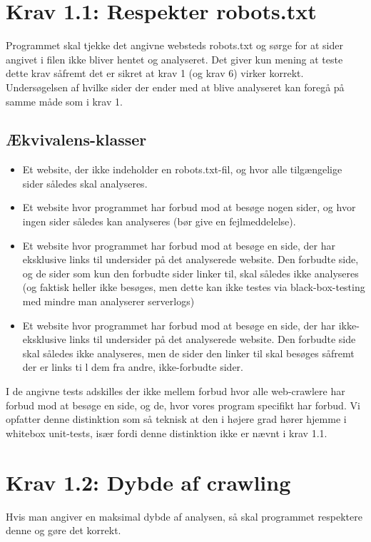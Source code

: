 \documentclass[a4paper,oneside,article, titlepage]{memoir}
\begin{document}
\section*{Krav 1.1: Respekter robots.txt}

Programmet skal tjekke det angivne websteds robots.txt og sørge for at
sider angivet i filen ikke bliver hentet og analyseret. Det giver kun
mening at teste dette krav såfremt det er sikret at krav 1 (og krav 6)
virker korrekt. Undersøgelsen af hvilke sider der ender med at blive
analyseret kan foregå på samme måde som i krav 1.

\subsection{Ækvivalens-klasser}
\begin{itemize}
\item Et website, der ikke indeholder en robots.txt-fil, og hvor alle
  tilgængelige sider således skal analyseres.
\item Et website hvor programmet har forbud mod at besøge nogen sider,
  og hvor ingen sider således kan analyseres (bør give en
  fejlmeddelelse).
\item Et website hvor programmet har forbud mod at besøge en side, der
  har eksklusive links til undersider på det analyserede website. Den
  forbudte side, og de sider som kun den forbudte sider linker til,
  skal således ikke analyseres (og faktisk heller ikke besøges, men
  dette kan ikke testes via black-box-testing med mindre man
  analyserer serverlogs)
\item Et website hvor programmet har forbud mod at besøge en side, der
  har ikke-eksklusive links til undersider på det analyserede
  website. Den forbudte side skal således ikke analyseres, men de
  sider den linker til skal besøges såfremt der er links ti l dem fra
  andre, ikke-forbudte sider.
\end{itemize}

I de angivne tests adskilles der ikke mellem forbud hvor alle
web-crawlere har forbud mod at besøge en side, og de, hvor vores
program specifikt har forbud. Vi opfatter denne distinktion som så
teknisk at den i højere grad hører hjemme i whitebox unit-tests, især
fordi denne distinktion ikke er nævnt i krav 1.1.

\section*{Krav 1.2: Dybde af crawling}
Hvis man angiver en maksimal dybde af analysen, så skal programmet
respektere denne og gøre det korrekt.
\end{document}
